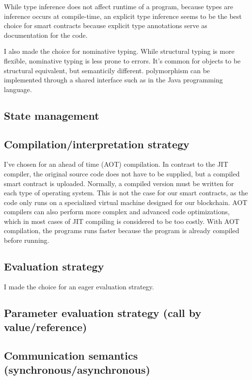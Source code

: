 \documentclass{uva-inf-article}
\begin{document}
\par While type inference does not affect runtime of a program, because types are inference occurs at compile-time,
an explicit type inference seems to be the best choice for smart contracts because  
explicit type annotations serve as documentation for the code.

\par I also made the choice for nominative typing. 
While structural typing is more flexible, nominative typing is less prone to errors.
It's common for objects to be structural equivalent, but semanticily different.
polymorphism can be implemented through a shared interface such as in the Java programming language.

\subsection{State management}
\par 

\subsection{Compilation/interpretation strategy}
\par I've chosen for an ahead of time (AOT) compilation. In contrast to the JIT compiler, 
the original source code does not have to be supplied, but a compiled smart contract is uploaded.
Normally, a compiled version must be written for each type of operating system. 
This is not the case for our smart contracts, as the code only runs on a specialized virtual machine 
designed for our blockchain. AOT compilers can also perform more complex and advanced code optimizations,
which in most cases of JIT compiling is considered to be too costly.
With AOT compilation, the programs runs faster because the program is already compiled before running.

\subsection{Evaluation strategy}
I made the choice for an eager evaluation strategy.

\subsection{Parameter evaluation strategy (call by value/reference)}
\subsection{Communication semantics (synchronous/asynchronous)}
\end{document}
